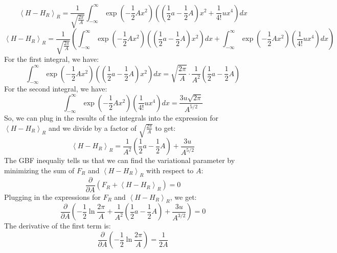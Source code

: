 \documentclass[12pt]{article}
\begin{document}
\begin{equation}
\left\langle H-H_R\right\rangle_R=\frac{1}{\sqrt{\frac{2 \pi}{A}}} \int_{-\infty}^{\infty} \exp \left(-\frac{1}{2} A x^2\right)\left(\left(\frac{1}{2} a-\frac{1}{2} A\right) x^2+\frac{1}{4 !} u x^4\right) d x
\end{equation}
\begin{equation}
\left\langle H-H_R\right\rangle_R=\frac{1}{\sqrt{\frac{2 \pi}{A}}} \left(\int_{-\infty}^{\infty} \exp \left(-\frac{1}{2} A x^2\right)\left(\left(\frac{1}{2} a-\frac{1}{2} A\right) x^2\right) d x+\int_{-\infty}^{\infty} \exp \left(-\frac{1}{2} A x^2\right)\left(\frac{1}{4 !} u x^4\right) d x\right)
\end{equation}
For the first integral, we have:
\begin{equation}
  \int_{-\infty}^{\infty} \exp \left(-\frac{1}{2} A x^2\right)\left(\left(\frac{1}{2} a-\frac{1}{2} A\right) x^2\right) dx = \sqrt{\frac{2\pi}{A}} \cdot \frac{1}{A^2} \left(\frac{1}{2} a - \frac{1}{2} A\right)
\end{equation}
For the second integral, we have:
\begin{equation}
  \int_{-\infty}^{\infty} \exp \left(-\frac{1}{2} A x^2\right)\left(\frac{1}{4!} u x^4\right) dx = \frac{3u\sqrt{2\pi}}{A^{5/2}}
\end{equation}
So, we can plug in the results of the integrals into the expression for $\left\langle H-H_R\right\rangle_R$ and we divide by a factor of $\sqrt{\frac{2 \pi}{A}}$ to get:
\begin{equation}
\left\langle H-H_R\right\rangle_R=\frac{1}{A^2} \left(\frac{1}{2} a - \frac{1}{2} A\right) + \frac{3u}{A^{5/2}}
\end{equation}
The GBF inequaliy tells us that we can find the variational parameter by minimizing the sum of $F_R$ and $\left\langle H-H_R\right\rangle_R$ with respect to $A$:
\begin{equation}
\frac{\partial}{\partial A} \left(F_R + \left\langle H-H_R\right\rangle_R\right) = 0
\end{equation}
Plugging in the expressions for $F_R$ and $\left\langle H-H_R\right\rangle_R$, we get:
\begin{equation}
\frac{\partial}{\partial A} \left(-\frac{1}{2} \ln \frac{2 \pi}{A} + \frac{1}{A^2} \left(\frac{1}{2} a - \frac{1}{2} A\right) + \frac{3u}{A^{3/2}}\right) = 0
\end{equation}
The derivative of the first term is:  
\begin{equation}
\frac{\partial}{\partial A} \left(-\frac{1}{2} \ln \frac{2 \pi}{A}\right) = \frac{1}{2A}
\end{equation}
\end{document}
